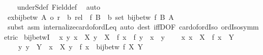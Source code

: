 \begin{isabellebody}
%
\isadelimproof
\ \ %
\endisadelimproof
%
\isatagproof
{}\isamarkupfalse%
\ underS{\isacharunderscore}{\kern0pt}def\ Field{\isacharunderscore}{\kern0pt}def\ \isamarkupfalse%
\ auto%
\endisatagproof
{\isafoldproof}%
%
\isadelimproof
\isanewline
%
\endisadelimproof
\isanewline
{}\isamarkupfalse%
\ ex{\isacharunderscore}{\kern0pt}bij{\isacharunderscore}{\kern0pt}betw{\isacharcolon}{\kern0pt}\ {\isachardoublequoteopen}{\isacharbar}{\kern0pt}A{\isacharbar}{\kern0pt}\ {\isasymle}o\ {\isacharparenleft}{\kern0pt}r\ {\isacharcolon}{\kern0pt}{\isacharcolon}{\kern0pt}\ {\isacharprime}{\kern0pt}b\ rel{\isacharparenright}{\kern0pt}\ {\isasymLongrightarrow}\ {\isasymexists}f\ B\ {\isacharcolon}{\kern0pt}{\isacharcolon}{\kern0pt}\ {\isacharprime}{\kern0pt}b\ set{\isachardot}{\kern0pt}\ bij{\isacharunderscore}{\kern0pt}betw\ f\ B\ A{\isachardoublequoteclose}\isanewline
%
\isadelimproof
\ \ %
\endisadelimproof
%
\isatagproof
{}\isamarkupfalse%
\ {\isacharparenleft}{\kern0pt}subst\ {\isacharparenleft}{\kern0pt}asm{\isacharparenright}{\kern0pt}\ internalize{\isacharunderscore}{\kern0pt}card{\isacharunderscore}{\kern0pt}of{\isacharunderscore}{\kern0pt}ordLeq{\isacharparenright}{\kern0pt}\ {\isacharparenleft}{\kern0pt}auto\ dest{\isacharbang}{\kern0pt}{\isacharcolon}{\kern0pt}\ iffD{}{\isacharbrackleft}{\kern0pt}OF\ card{\isacharunderscore}{\kern0pt}of{\isacharunderscore}{\kern0pt}ordIso\ ordIso{\isacharunderscore}{\kern0pt}symmetric{\isacharbrackright}{\kern0pt}{\isacharparenright}{\kern0pt}%
\endisatagproof
{\isafoldproof}%
%
\isadelimproof
\isanewline
%
\endisadelimproof
\isanewline
{}\isamarkupfalse%
\ bij{\isacharunderscore}{\kern0pt}betwI{\isacharprime}{\kern0pt}{\isacharcolon}{\kern0pt}\isanewline
\ \ {\isachardoublequoteopen}{\isasymlbrakk}{\isasymAnd}x\ y{\isachardot}{\kern0pt}\ {\isasymlbrakk}x\ {\isasymin}\ X{\isacharsemicolon}{\kern0pt}\ y\ {\isasymin}\ X{\isasymrbrakk}\ {\isasymLongrightarrow}\ {\isacharparenleft}{\kern0pt}f\ x\ {\isacharequal}{\kern0pt}\ f\ y{\isacharparenright}{\kern0pt}\ {\isacharequal}{\kern0pt}\ {\isacharparenleft}{\kern0pt}x\ {\isacharequal}{\kern0pt}\ y{\isacharparenright}{\kern0pt}{\isacharsemicolon}{\kern0pt}\isanewline
\ \ \ \ {\isasymAnd}x{\isachardot}{\kern0pt}\ x\ {\isasymin}\ X\ {\isasymLongrightarrow}\ f\ x\ {\isasymin}\ Y{\isacharsemicolon}{\kern0pt}\isanewline
\ \ \ \ {\isasymAnd}y{\isachardot}{\kern0pt}\ y\ {\isasymin}\ Y\ {\isasymLongrightarrow}\ {\isasymexists}x\ {\isasymin}\ X{\isachardot}{\kern0pt}\ y\ {\isacharequal}{\kern0pt}\ f\ x{\isasymrbrakk}\ {\isasymLongrightarrow}\ bij{\isacharunderscore}{\kern0pt}betw\ f\ X\ Y{\isachardoublequoteclose}\isanewline

\end{isabellebody}
